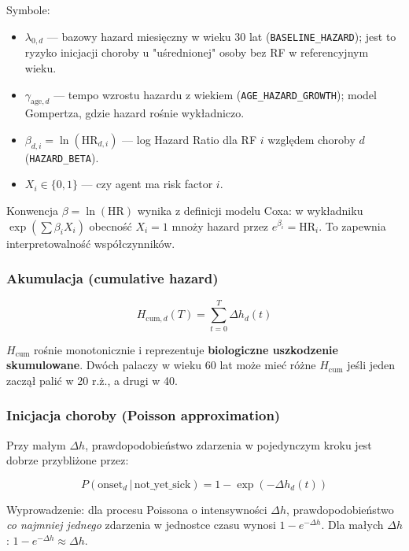 \documentclass[11pt,a4paper]{article}
\newcommand{\cum}[1][]{H_{\mathrm{cum}#1}}
\newcommand{\baseh}{\lambda}                       %
\begin{document}
Symbole:
\begin{itemize}[leftmargin=*]
  \item $\baseh_{0,d}$ --- bazowy hazard miesięczny w wieku 30 lat (\texttt{BASELINE\_HAZARD}); jest to ryzyko inicjacji choroby u "uśrednionej" osoby bez RF w referencyjnym wieku.
  \item $\gamma_{\text{age},d}$ --- tempo wzrostu hazardu z wiekiem (\texttt{AGE\_HAZARD\_GROWTH}); model Gompertza, gdzie hazard rośnie wykładniczo.
  \item $\beta_{d,i} = \ln(\mathrm{HR}_{d,i})$ --- log Hazard Ratio dla RF $i$ względem choroby $d$ (\texttt{HAZARD\_BETA}).
  \item $X_i \in \{0,1\}$ --- czy agent ma risk factor $i$.
\end{itemize}

Konwencja $\beta = \ln(\mathrm{HR})$ wynika z definicji modelu Coxa: w wykładniku $\exp(\sum \beta_i X_i)$ obecność $X_i = 1$ mnoży hazard przez $e^{\beta_i} = \mathrm{HR}_i$. To zapewnia interpretowalność współczynników.

\subsubsection{Akumulacja (cumulative hazard)}

\begin{formulabox}
\[
\cum[,d](T) = \sum_{t=0}^{T} \Delta h_d(t)
\]
\end{formulabox}

$\cum$ rośnie monotonicznie i reprezentuje \textbf{biologiczne uszkodzenie skumulowane}. Dwóch palaczy w wieku 60 lat może mieć różne $\cum$ jeśli jeden zaczął palić w 20 r.ż., a drugi w 40.

\subsubsection{Inicjacja choroby (Poisson approximation)}

Przy małym $\Delta h$, prawdopodobieństwo zdarzenia w pojedynczym kroku jest dobrze przybliżone przez:
\begin{formulabox}
\[
P(\text{onset}_d \,|\, \text{not\_yet\_sick}) = 1 - \exp(-\Delta h_d(t))
\]
\end{formulabox}

Wyprowadzenie: dla procesu Poissona o intensywności $\Delta h$, prawdopodobieństwo \emph{co najmniej jednego} zdarzenia w jednostce czasu wynosi $1 - e^{-\Delta h}$. Dla małych $\Delta h$: $1 - e^{-\Delta h} \approx \Delta h$.
\end{document}

